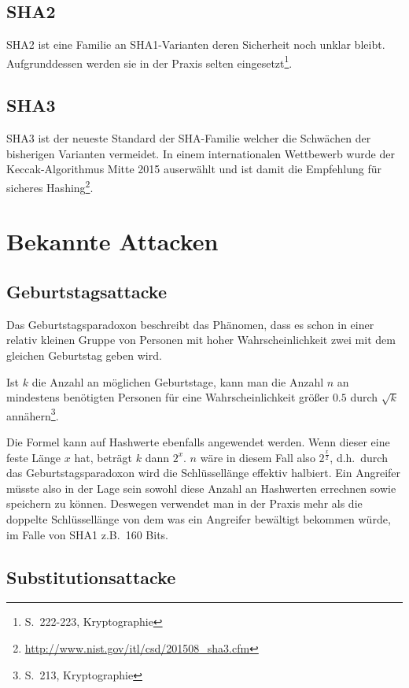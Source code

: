 \subsection{\ac{SHA2}}

SHA2 ist eine Familie an SHA1-Varianten deren Sicherheit noch unklar
bleibt.  Aufgrunddessen werden sie in der Praxis selten
eingesetzt\footnote{S.~222-223, Kryptographie}.

\subsection{\ac{SHA3}}

SHA3 ist der neueste Standard der SHA-Familie welcher die Schwächen
der bisherigen Varianten vermeidet.  In einem internationalen
Wettbewerb wurde der Keccak-Algorithmus Mitte 2015 auserwählt und ist
damit die Empfehlung für sicheres
Hashing\footnote{\url{http://www.nist.gov/itl/csd/201508_sha3.cfm}}.

\section{Bekannte Attacken}

\subsection{Geburtstagsattacke}

Das Geburtstagsparadoxon beschreibt das Phänomen, dass es schon in
einer relativ kleinen Gruppe von Personen mit hoher Wahrscheinlichkeit
zwei mit dem gleichen Geburtstag geben wird.

Ist $k$ die Anzahl an möglichen Geburtstage, kann man die Anzahl $n$
an mindestens benötigten Personen für eine Wahrscheinlichkeit größer
$0.5$ durch $\sqrt{k}$ annähern\footnote{S.~213, Kryptographie}.

Die Formel kann auf Hashwerte ebenfalls angewendet werden.  Wenn
dieser eine feste Länge $x$ hat, beträgt $k$ dann $2^x$.  $n$ wäre in
diesem Fall also $2^{\frac{x}{2}}$, d.h.~durch das
Geburtstagsparadoxon wird die Schlüssellänge effektiv halbiert.  Ein
Angreifer müsste also in der Lage sein sowohl diese Anzahl an
Hashwerten errechnen sowie speichern zu können.  Deswegen verwendet
man in der Praxis mehr als die doppelte Schlüssellänge von dem was ein
Angreifer bewältigt bekommen würde, im Falle von SHA1 z.B.~160 Bits.

\subsection{Substitutionsattacke}


